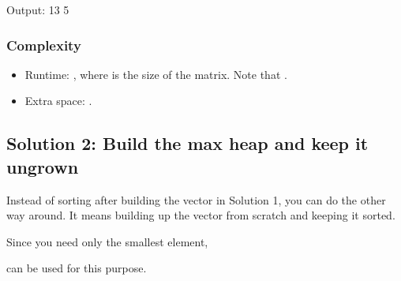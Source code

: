 \documentclass[letterpaper,12pt,english]{book}
\begin{document}
\begin{sphinxVerbatim}[commandchars=\\\{\}]
\end{sphinxVerbatim}

\begin{sphinxVerbatim}[commandchars=\\\{\}]
Output:
13
\PYGZhy{}5
\end{sphinxVerbatim}


\subsubsection{Complexity}
\label{\detokenize{Priority_Queue/378_Kth_Smallest_Element_in_a_Sorted_Matrix:complexity}}\begin{itemize}
\item {} 
\sphinxAtStartPar
Runtime: , where  is the size of the matrix. Note that .

\item {} 
\sphinxAtStartPar
Extra space: .

\end{itemize}


\subsection{Solution 2: Build the max heap and keep it ungrown}
\label{\detokenize{Priority_Queue/378_Kth_Smallest_Element_in_a_Sorted_Matrix:solution-2-build-the-max-heap-and-keep-it-ungrown}}
\sphinxAtStartPar
Instead of sorting after building the vector in Solution 1, you can do the other way around. It means building up the vector from scratch and keeping it sorted.

\sphinxAtStartPar
Since you need only the  smallest element, %
\begin{footnote}[62]\sphinxAtStartFootnote
{}
%
\end{footnote} can be used for this purpose.
\end{document}
